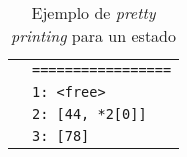 \begin{table}[h!]
\begin{tabular}{|l|l|}
                                                                                                               & \verb|=================| \\
                                                                                                               & \verb|1: <free>| \\
                                                                                                               & \verb|2: [44, *2[0]]| \\
                                                                                                               & \verb|3: [78]| \\
  \hline
\end{tabular}

\caption{Ejemplo de \textit{pretty printing} para un estado}
\label{tab:pretty_simp_state}
\end{table}

